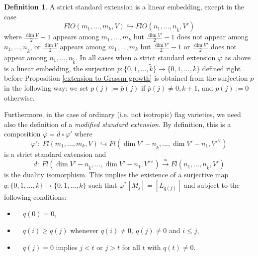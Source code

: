 \documentclass[12pt]{amsart}
\renewcommand{\phi}{\varphi}
\theoremstyle{definition}
\newtheorem{definition}[theorem]{Definition}
\begin{document}
\begin{definition}
A strict standard extension is a linear embedding, except  in the case
$$
FlO(m_1,...,m_k,V)\hookrightarrow FlO(n_1,...,n_{\tilde{k}},V')
$$
where $\frac{\dim V}{2}-1$ appears among $m_1,...,m_k$ but 
$\frac{\dim V'}{2}-1$ does not appear among $n_1,...,
n_{\tilde{k}}$, or $\frac{\dim V}{2}$ appears among $m_1,...,
m_k$ but $\frac{\dim V'}{2}-1$ or $\frac{\dim V'}{2}$ does not 
appear among $n_1,...,n_{\tilde{k}}$. In all cases when a strict
standard extension $\varphi$ as above is a linear embedding, the 
surjection $p:\{0,1,...,\tilde{k}\}\to\{0,1,...,k\}$ defined right 
before Proposition \ref{extension to Grassm growth} is obtained from 
the surjection $\overline{p}$ in the following way: we set
$p(j):=\overline{p}(j)$ if $\overline{p}(j)\ne0,k+1$, and 
$p(j):=0$ otherwise.
\end{definition}


Furthermore, in the case of ordinary (i.e. not isotropic) flag
varieties, we need also the definition of a \textit{modified 
standard extension}. By definition, this is a composition
$\phi=d\circ\phi'$ where
\begin{equation*}\label{phi modified}
\phi':\ Fl(m_1,...,m_k,V)\hookrightarrow Fl(\dim V'-
n_{\tilde{k}},..., \dim V'-n_1,V'^{\vee})
\end{equation*}
is a strict standard extension and
\begin{equation*}\label{duality}
d:\ Fl(\dim V'-n_{\tilde{k}},...,\dim V'-n_1,V'^{\vee})
\xrightarrow{\simeq} Fl(n_1,...,n_{\tilde{k}},V')
\end{equation*}
is the duality isomorphism. This implies the existence of a
surjective map $q:\{0,1,...,\tilde{k}\}\to\{0,1,...,k\}$ such that 
$\phi^*[M_j]=[L_{q(j)}]$ and subject to the following conditions:
\begin{itemize}
\item \ \ $q(0)=0$,
\item \ \ $q(i)\ge q(j)$ whenever $q(i)\ne0,\ q(j)\ne0$ and $i\le j$,
\item \ \ $q(j)=0$ implies $j<t$ or $j>t$ for all $t$ with 
$q(t)\ne0$.
\end{itemize}
\end{document}
